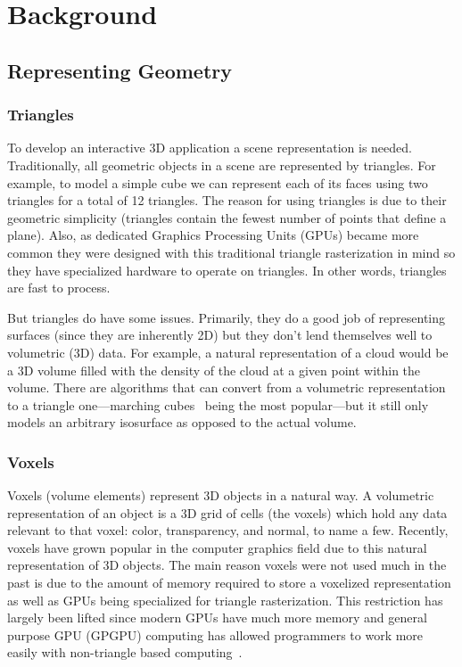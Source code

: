 \chapter{Background}

\section{Representing Geometry}
\subsection{Triangles}
To develop an interactive 3D application a scene representation is needed. Traditionally, all geometric objects in a scene are represented by triangles. For example, to model a simple cube we can represent each of its faces using two triangles for a total of 12 triangles. The reason for using triangles is due to their geometric simplicity (triangles contain the fewest number of points that define a plane). Also, as dedicated Graphics Processing Units (GPUs) became more common they were designed with this traditional triangle rasterization in mind so they have specialized hardware to operate on triangles. In other words, triangles are fast to process.

But triangles do have some issues. Primarily, they do a good job of representing surfaces (since they are inherently 2D) but they don't lend themselves well to volumetric (3D) data. For example, a natural representation of a cloud would be a 3D volume filled with the density of the cloud at a given point within the volume. There are algorithms that can convert from a volumetric representation to a triangle one---marching cubes~\cite{Lorensen:1987:MCH:37402.37422} being the most popular---but it still only models an arbitrary isosurface as opposed to the actual volume.

\subsection{Voxels}
Voxels (volume elements) represent 3D objects in a natural way. A volumetric representation of an object is a 3D grid of cells (the voxels) which hold any data relevant to that voxel: color, transparency, and normal, to name a few. Recently, voxels have grown popular in the computer graphics field due to this natural representation of 3D objects. The main reason voxels were not used much in the past is due to the amount of memory required to store a voxelized representation as well as GPUs being specialized for triangle rasterization. This restriction has largely been lifted since modern GPUs have much more memory and general purpose GPU (GPGPU) computing has allowed programmers to work more easily with non-triangle based computing~\cite{Crassin:2009:GRS:1507149.1507152,crassin2012dynamic}.

